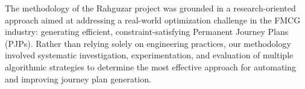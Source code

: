 
The methodology of the Rahguzar project was grounded in a research-oriented approach aimed at addressing a real-world optimization challenge in the FMCG industry: generating efficient, constraint-satisfying Permanent Journey Plans (PJPs). Rather than relying solely on engineering practices, our methodology involved systematic investigation, experimentation, and evaluation of multiple algorithmic strategies to determine the most effective approach for automating and improving journey plan generation.
